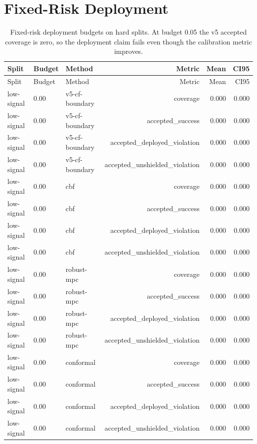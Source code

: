 \documentclass{article}
\begin{document}
\section{Fixed-Risk Deployment}

\begingroup
\scriptsize
\begin{longtable}{@{}lllrrr@{}}
\caption{Fixed-risk deployment budgets on hard splits. At budget 0.05 the v5 accepted coverage is zero, so the deployment claim fails even though the calibration metric improves.}\\
\toprule
Split & Budget & Method & Metric & Mean & CI95 \\
\midrule
\endfirsthead
\toprule
Split & Budget & Method & Metric & Mean & CI95 \\
\midrule
\endhead
low-signal & 0.00 & v5-cf-boundary & coverage & 0.000 & 0.000 \\
low-signal & 0.00 & v5-cf-boundary & accepted\_success & 0.000 & 0.000 \\
low-signal & 0.00 & v5-cf-boundary & accepted\_deployed\_violation & 0.000 & 0.000 \\
low-signal & 0.00 & v5-cf-boundary & accepted\_unshielded\_violation & 0.000 & 0.000 \\
low-signal & 0.00 & cbf & coverage & 0.000 & 0.000 \\
low-signal & 0.00 & cbf & accepted\_success & 0.000 & 0.000 \\
low-signal & 0.00 & cbf & accepted\_deployed\_violation & 0.000 & 0.000 \\
low-signal & 0.00 & cbf & accepted\_unshielded\_violation & 0.000 & 0.000 \\
low-signal & 0.00 & robust-mpc & coverage & 0.000 & 0.000 \\
low-signal & 0.00 & robust-mpc & accepted\_success & 0.000 & 0.000 \\
low-signal & 0.00 & robust-mpc & accepted\_deployed\_violation & 0.000 & 0.000 \\
low-signal & 0.00 & robust-mpc & accepted\_unshielded\_violation & 0.000 & 0.000 \\
low-signal & 0.00 & conformal & coverage & 0.000 & 0.000 \\
low-signal & 0.00 & conformal & accepted\_success & 0.000 & 0.000 \\
low-signal & 0.00 & conformal & accepted\_deployed\_violation & 0.000 & 0.000 \\
low-signal & 0.00 & conformal & accepted\_unshielded\_violation & 0.000 & 0.000 \\

\end{longtable}
\end{document}
